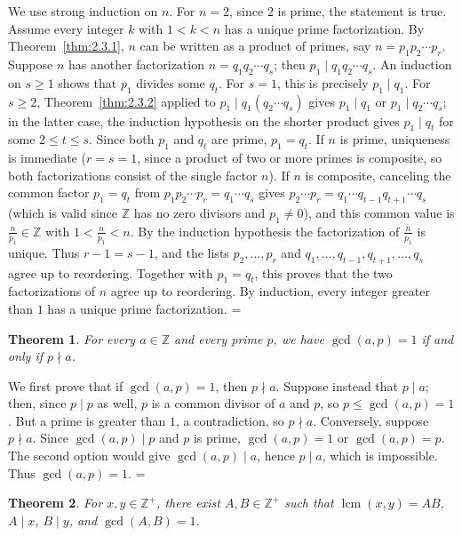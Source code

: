 \documentclass[11pt]{article}
\makeatletter
\theoremstyle{ntstyle}
\newtheorem{theorem}{Theorem}[subsection]
\let\nt@closedisplay\]
\def\nt@guardedclose{\@ifnextchar\par{\nt@closeafterpar}{\@ifnextchar\end{\postdisplaypenalty\@M\nt@closedisplay}{\nt@closedisplay}}}
\def\nt@closeafterpar\par{\@ifnextchar\par{\nt@closeafterpar}{\@ifnextchar\end{\postdisplaypenalty\@M\nt@closedisplay\par}{\nt@closedisplay\par}}}
\renewenvironment{proof}[1][\proofname]{\par
  \pushQED{\qed}\normalfont\topsep\medskipamount\edef\nt@afterproof{\@endparpenalty=\the\@endparpenalty\relax}\@beginparpenalty\@M\@endparpenalty\@M\let\]\nt@guardedclose\trivlist\item[]\textit{#1\@addpunct{.}} \ignorespaces}{\ifvmode\addpenalty\@M\fi\popQED\nt@afterproof\endtrivlist\@endpefalse}
\DeclareMathOperator{\lcm}{lcm}
\makeatother
\begin{document}
\begin{proof} We use strong induction on $n$. For $n = 2$,
	since $2$ is prime, the statement is true. Assume every integer $k$
	with $1 < k < n$ has a unique prime factorization. By Theorem~\ref{thm:2.3.1}, $n$ can be written
	as a product of primes, say
	$n=p_1p_2\cdots p_r$. Suppose $n$ has another factorization $n=q_1q_2
		\cdots q_s$; then $p_1 \mid q_1 q_2 \cdots q_s$. An induction on $s\ge1$ shows that $p_1$ divides some $q_t$.
	For $s=1$, this is precisely $p_1\mid q_1$.
	For $s\ge2$, Theorem~\ref{thm:2.3.2} applied to
	$p_1\mid q_1(q_2\cdots q_s)$ gives $p_1\mid q_1$ or
	$p_1\mid q_2\cdots q_s$; in the latter case, the induction hypothesis
	on the shorter product gives $p_1\mid q_t$ for some $2\le t\le s$.
	Since both $p_1$
	and $q_t$ are prime, $p_1 = q_t$. If $n$ is prime, uniqueness is
	immediate ($r = s = 1$, since a product of two or more primes is composite, so both factorizations
	consist of the single factor $n$). If $n$ is
	composite, canceling the common factor $p_1 = q_t$ from $p_1 p_2
		\cdots p_r = q_1 \cdots q_s$ gives $p_2 \cdots p_r = q_1 \cdots
		q_{t-1} q_{t+1} \cdots q_s$ (which is valid since $\mathbb{Z}$ has no zero
	divisors and $p_1 \neq 0$), and this common value is $\tfrac{n}{p_1}
		\in \mathbb{Z}$ with $1 < \tfrac{n}{p_1} < n$. By the induction
	hypothesis the factorization of $\tfrac{n}{p_1}$ is unique.
	Thus $r-1=s-1$, and the lists $p_2,\ldots,p_r$ and
	$q_1,\ldots,q_{t-1},q_{t+1},\ldots,q_s$ agree up to reordering.
	Together with $p_1=q_t$, this proves that the two factorizations of $n$
	agree up to reordering. By induction, every
	integer greater than $1$ has a unique prime factorization.
\end{proof}
\begin{theorem}\label{thm:2.3.4} For every $a \in \mathbb{Z}$ and every
	prime $p$, we have $\gcd(a, p) = 1$ if and only if $p \nmid a$.
\end{theorem}

\begin{proof} We first prove that if $\gcd(a, p) = 1$,
	then $p \nmid a$. Suppose instead that $p \mid a$; then, since $p
		\mid p$ as well, $p$ is a common divisor of $a$ and $p$, so $p \le
		\gcd(a, p) = 1$. But a prime is greater than $1$, a contradiction, so
	$p \nmid a$. Conversely, suppose $p \nmid a$. Since
	$\gcd(a, p) \mid p$ and $p$ is prime, $\gcd(a, p) = 1$ or $\gcd(a, p)
		= p$. The second option would give $\gcd(a, p) \mid a$, hence $p \mid a$,
	which is impossible. Thus $\gcd(a, p) = 1$.
\end{proof}
\begin{theorem}\label{thm:2.3.5} For $x, y \in \mathbb{Z}^+$,
	there exist $A, B \in \mathbb{Z}^+$ such that
	$\lcm(x, y) = AB$, $A \mid x$, $B \mid y$, and $\gcd(A, B) = 1$.
\end{theorem}
\end{document}
